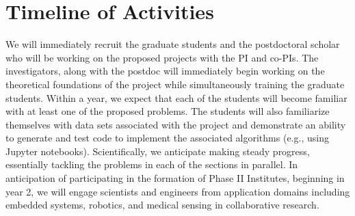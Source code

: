 \section{Timeline of Activities}
We will immediately recruit the graduate students and the postdoctoral scholar who will be working on the proposed projects with the PI and co-PIs. The investigators, along with the postdoc will immediately begin working on the theoretical foundations of the project while simultaneously training the graduate students. Within a year, we expect that each of the students will become familiar with at least one of the proposed problems. The students will also familiarize themselves with data sets associated with the project and demonstrate an ability to generate and test code to implement the associated algorithms (e.g., using Jupyter notebooks). Scientifically, we anticipate making steady progress, essentially tackling the problems in each of the sections in parallel. In anticipation of participating in the formation of Phase II Institutes, beginning in year 2, we will  engage scientists and engineers from application domains including embedded systems, robotics, and medical sensing in collaborative research. 